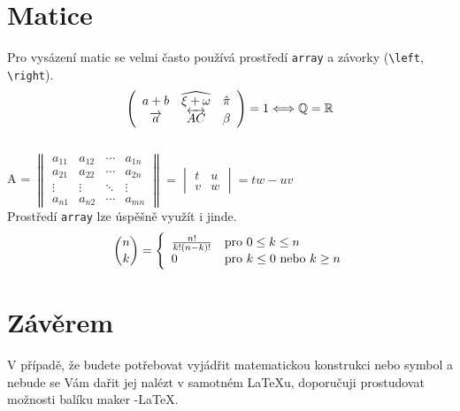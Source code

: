 \documentclass[11pt,a4paper]{article}
\begin{document}
\begin{twocolumn}
\section{Matice}
Pro vysázení matic se velmi často používá prostředí \verb|array| a závorky (\verb|\left|, \verb|\right|).
\newpage
$$\left(
\begin{array}{c c c}
a + b & \widehat{\xi + \omega} & \hat{\pi} \\
\overrightarrow{a} & \overleftrightarrow{AC} & \beta
\end{array}
\right) = 1  \Longleftrightarrow \mathbb{Q} = \mathbb{R}$$\\
A = $\begin{Vmatrix}
	a_{11} & a_{12} & \cdots & a_{1n}\\
	a_{21} & a_{22} & \cdots & a_{2n}\\
	\vdots & \vdots & \ddots & \vdots\\
	a_{n1} & a_{n2} & \cdots & a_{mn}
        \end{Vmatrix} 
= \begin{vmatrix}
	t & u \\
	v & w
\end{vmatrix} = tw - uv$\\

Prostředí \verb|array| lze úspěšně využít i jinde.
$$ \binom{n}{k} = \Bigg\{ 
\begin{array}{l l}
\frac{n!}{k!(n-k)!} & \text{pro } 0 \leq k \leq n \\
0 & \text{pro } k \le 0 \text{ nebo } k \ge n
\end{array}
$$
\section{Závěrem}
V případě, že budete potřebovat vyjádřit matematickou konstrukci nebo symbol a nebude se Vám dařit jej nalézt v samotném \LaTeX u, doporučuji prostudovat možnosti balíku maker \AmS-\LaTeX.
\end{twocolumn}
\end{document}
